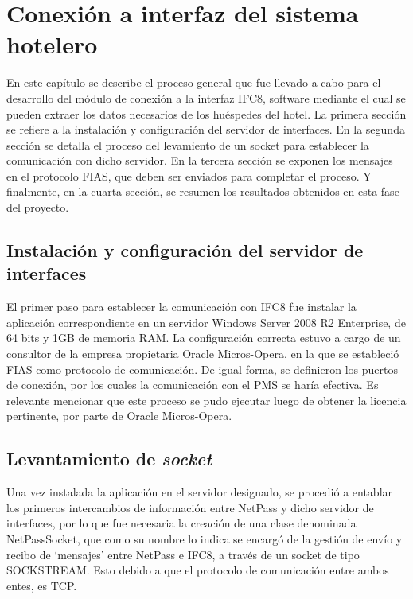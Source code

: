 \chapter{Conexión a interfaz del sistema hotelero}\label{chapter:Conexion a interfaz del sistema hotelero}

		En este capítulo se describe el proceso general que fue llevado a cabo para el desarrollo del módulo de conexión a la interfaz IFC8, software mediante el cual se pueden extraer los datos necesarios de los huéspedes del hotel. La primera sección se refiere a la instalación y configuración del servidor de interfaces. En la segunda sección se detalla el proceso del levamiento de un socket para establecer la comunicación con dicho servidor. En la tercera sección se exponen los mensajes en el protocolo FIAS, que deben ser enviados para completar el proceso. Y finalmente, en la cuarta sección, se resumen los resultados obtenidos en esta fase del proyecto.

\section{Instalación y configuración del servidor de interfaces} \label{sect:Instalacion y configuracion del servidor de interfaces}
	El primer paso para establecer la comunicación con IFC8 fue instalar la aplicación  correspondiente en un servidor Windows Server 2008 R2 Enterprise, de 64 bits y 1GB de memoria RAM. La configuración correcta estuvo a cargo de un consultor de la empresa propietaria Oracle Micros-Opera, en la que se estableció FIAS como protocolo de comunicación. De igual forma, se definieron los puertos de conexión, por los cuales la comunicación con el PMS se haría efectiva. Es relevante mencionar que este proceso se pudo ejecutar luego de obtener la licencia pertinente, por parte de Oracle Micros-Opera.

\section{Levantamiento de \textit{socket}}
	Una vez instalada la aplicación en el servidor designado, se procedió a entablar los primeros intercambios de información entre NetPass y dicho servidor de interfaces, por lo que fue necesaria la creación de una clase denominada NetPassSocket, que como su nombre lo indica se encargó de la gestión de envío y recibo de ‘mensajes’ entre NetPass e IFC8, a través de un socket de tipo SOCKSTREAM. Esto debido a que el protocolo de comunicación entre ambos entes, es TCP. 

